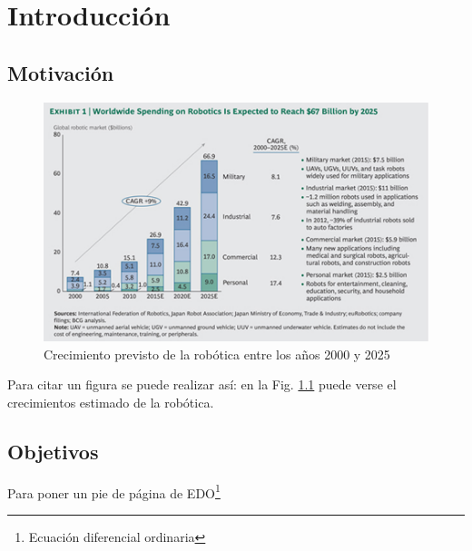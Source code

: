 
\chapter{Introducción} \label{cap1}
\setcounter{page}{1}


\newpage


\section{Motivación} \label{s1_1}
	
	\blindtext
	
	
	\begin{figure}[htb]
		\centering
		\includegraphics[width=0.6\linewidth]{capitulo_01/figuras_dir/crecimiento_robotica.png}
		\caption{Crecimiento previsto de la robótica entre los años 2000 y 2025}
		\label{Figura1_01}
	\end{figure} 
	
	Para citar un figura se puede realizar así: en la Fig. \ref{Figura1_01} puede verse el crecimientos estimado de la robótica.
	
	


\section{Objetivos} \label{s1_1_2}


	\blindtext
	
	Para poner un pie de página de  EDO\footnote{Ecuación diferencial ordinaria}
